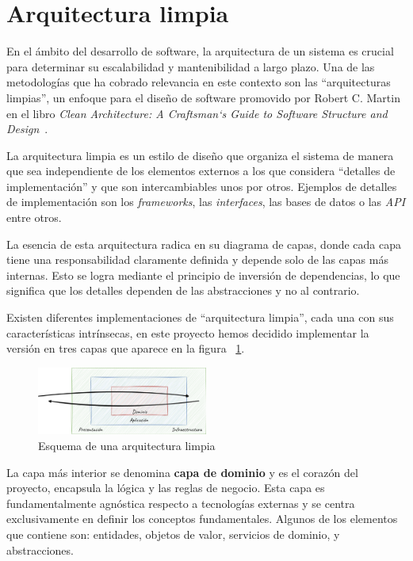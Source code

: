 \section{Arquitectura limpia}\label{sec:clean_architecture}

En el ámbito del desarrollo de software, la arquitectura de un sistema es crucial para determinar su escalabilidad y
mantenibilidad a largo plazo.
Una de las metodologías que ha cobrado relevancia en este contexto son las ``arquitecturas limpias'', un enfoque para el
diseño de software promovido por Robert C. Martin en el libro
\textit{Clean Architecture: A Craftsman`s Guide to Software Structure and Design}~\cite{book_martin_2017}.

La arquitectura limpia es un estilo de diseño que organiza el sistema de manera que sea independiente de los elementos
externos a los que considera ``detalles de implementación'' y que son intercambiables unos por otros.
Ejemplos de detalles de implementación son los \textit{frameworks}, las \textit{interfaces}, las bases de datos o las
\textit{API} entre otros.

La esencia de esta arquitectura radica en su diagrama de capas, donde cada capa tiene una responsabilidad claramente
definida y depende solo de las capas más internas.
Esto se logra mediante el principio de inversión de dependencias, lo que significa que los detalles dependen de las
abstracciones y no al contrario.

Existen diferentes implementaciones de ``arquitectura limpia'', cada una con sus características intrínsecas, en este
proyecto hemos decidido implementar la versión en tres capas que aparece en la figura
~\ref{fig:chapter_2.clean_architecture}.

\begin{figure}[ht]
    \begin{center}
        \includegraphics[width=0.5\textwidth]{./chapter/2/images/chapter_2.clean_architecture}
        \caption{Esquema de una arquitectura limpia}
        \label{fig:chapter_2.clean_architecture}
    \end{center}
\end{figure}

La capa más interior se denomina \textbf{capa de dominio} y es el corazón del proyecto, encapsula la lógica y las
reglas de negocio.
Esta capa es fundamentalmente agnóstica respecto a tecnologías externas y se centra exclusivamente en definir los
conceptos fundamentales.
Algunos de los elementos que contiene son: entidades, objetos de valor, servicios de dominio, y abstracciones.

